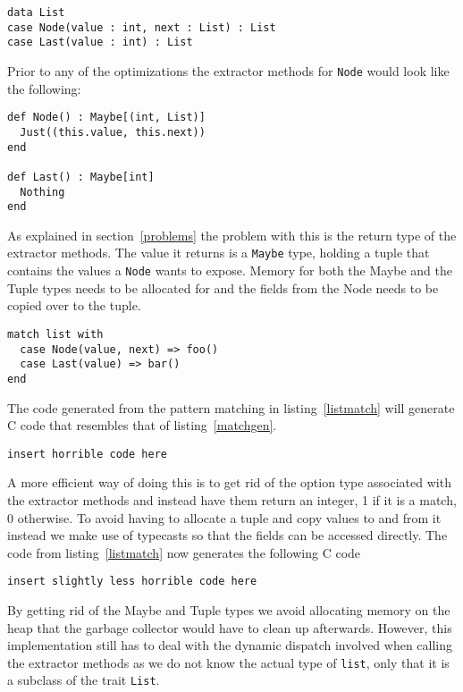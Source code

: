 \documentclass[10pt]{report}
\def\code#1{\texttt{#1}} %
\begin{document}
{\begin{lstlisting}[language=encore]
data List
case Node(value : int, next : List) : List
case Last(value : int) : List
\end{lstlisting}

\par{Prior to any of the optimizations the extractor methods for \code{Node} would look like the following:}

\begin{lstlisting}[language=encore,caption={Extractor methods before optimization}]
def Node() : Maybe[(int, List)]
  Just((this.value, this.next))
end

def Last() : Maybe[int]
  Nothing
end
\end{lstlisting}

\par{As explained in section~\ref{problems} the problem with this is the return type of the extractor methods. The value it returns is a \code{Maybe} type, holding a tuple that contains the values a \code{Node} wants to expose. Memory for both the Maybe and the Tuple types needs to be allocated for and the fields from the Node needs to be copied over to the tuple.}


\begin{lstlisting}[language=encore,caption={Pattern matching on a List},label=listmatch]
match list with
  case Node(value, next) => foo()
  case Last(value) => bar()
end
\end{lstlisting}

\par{The code generated from the pattern matching in listing~\ref{listmatch} will generate C code that resembles that of listing~\ref{matchgen}.}


\begin{lstlisting}[language=encore,caption={Pattern matching on a List},label=matchgen]
  insert horrible code here
\end{lstlisting}

\par{A more efficient way of doing this is to get rid of the option type associated with the extractor methods and instead have them return an integer, 1 if it is a match, 0 otherwise. To avoid having to allocate a tuple and copy values to and from it instead we make use of typecasts so that the fields can be accessed directly. The code from listing~\ref{listmatch} now generates the following C code}

\begin{lstlisting}[language=encore,caption={Pattern matching on a List},label=matchgen2]
  insert slightly less horrible code here
\end{lstlisting}
\par{By getting rid of the Maybe and Tuple types we avoid allocating memory on the heap that the garbage collector would have to clean up afterwards. However, this implementation still has to deal with the dynamic dispatch involved when calling the extractor methods as we do not know the actual type of \code{list}, only that it is a subclass of the trait \code{List}.}

}
\end{document}

